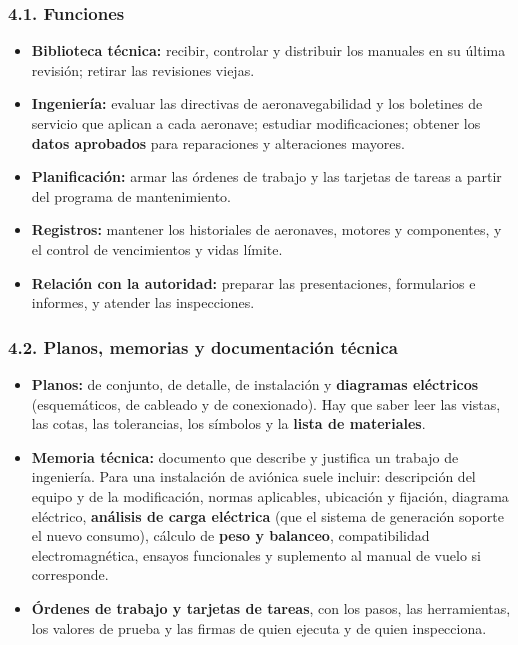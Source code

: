 \subsubsection*{4.1. Funciones}
\begin{itemize}
  \item \textbf{Biblioteca técnica:} recibir, controlar y distribuir los manuales en su última
        revisión; retirar las revisiones viejas.
  \item \textbf{Ingeniería:} evaluar las directivas de aeronavegabilidad y los boletines de
        servicio que aplican a cada aeronave; estudiar modificaciones; obtener los
        \textbf{datos aprobados} para reparaciones y alteraciones mayores.
  \item \textbf{Planificación:} armar las órdenes de trabajo y las tarjetas de tareas a partir del
        programa de mantenimiento.
  \item \textbf{Registros:} mantener los historiales de aeronaves, motores y componentes, y el
        control de vencimientos y vidas límite.
  \item \textbf{Relación con la autoridad:} preparar las presentaciones, formularios e informes, y
        atender las inspecciones.
\end{itemize}

\subsubsection*{4.2. Planos, memorias y documentación técnica}
\begin{itemize}
  \item \textbf{Planos:} de conjunto, de detalle, de instalación y \textbf{diagramas eléctricos}
        (esquemáticos, de cableado y de conexionado). Hay que saber leer las vistas, las cotas,
        las tolerancias, los símbolos y la \textbf{lista de materiales}.
  \item \textbf{Memoria técnica:} documento que describe y justifica un trabajo de ingeniería. Para
        una instalación de aviónica suele incluir: descripción del equipo y de la modificación,
        normas aplicables, ubicación y fijación, diagrama eléctrico, \textbf{análisis de carga
        eléctrica} (que el sistema de generación soporte el nuevo consumo), cálculo de \textbf{peso
        y balanceo}, compatibilidad electromagnética, ensayos funcionales y suplemento al manual
        de vuelo si corresponde.
  \item \textbf{Órdenes de trabajo y tarjetas de tareas}, con los pasos, las herramientas, los
        valores de prueba y las firmas de quien ejecuta y de quien inspecciona.
\end{itemize}

